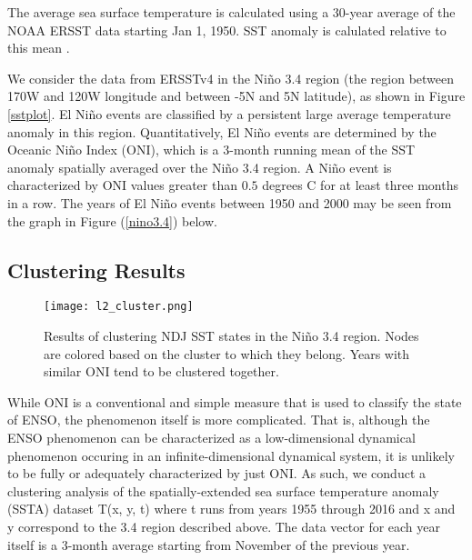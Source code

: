 \documentclass[10pt,journal,compsoc]{IEEEtran} %
\theoremstyle{definition}
\newcommand{\nino}{\text{Ni\~{n}o }}
\begin{document}
The average sea surface temperature is calculated using
a $30$-year average of the NOAA ERSST data starting Jan 1, 1950.  SST
anomaly is calulated relative to this mean
\cite{trenberth1997definition}.

We consider the data from ERSSTv4 in the Ni\~{n}o 3.4 region (the
region between 170W and 120W longitude and between -5N and 5N
latitude), as shown in Figure \ref{sstplot}.  El
Ni\~{n}o events are classified by a persistent large average
temperature anomaly in this region.  Quantitatively, El Ni\~{n}o
events are determined by the Oceanic Ni\~{n}o Index (ONI), which is a
$3$-month running mean of the SST anomaly spatially averaged 
over the Ni\~{n}o 3.4 region.  A Ni\~{n}o event is characterized by ONI
values greater than $0.5$ degrees C for at least three months in a
row.  The years of El Ni\~{n}o events between 1950 and 2000 may be
seen from the graph in Figure (\ref{nino3.4}) below.

\subsection{Clustering Results}
\begin{figure*}[htp]
\texttt{[image: l2\_cluster.png]}
\caption{Results of clustering NDJ SST states in the Ni\~{n}o 3.4
region.  Nodes are colored based on the cluster to which they belong.
Years with similar ONI tend to be clustered together.}\label{cluster}
\end{figure*}

While ONI is a conventional and simple measure that is used to classify the
state of ENSO, the phenomenon itself is more complicated. That is,
although the ENSO phenomenon can be characterized as a low-dimensional
dynamical phenomenon occuring in an infinite-dimensional dynamical
system, it is unlikely to be fully or adequately characterized by just
ONI. As such, we conduct a clustering analysis of the
spatially-extended sea surface temperature anomaly (SSTA) dataset T(x,
y, t) where t runs from years 1955 through 2016 and x and y correspond
to the \nino 3.4 region described above.  The data vector for each
year itself is a 3-month average starting from November of the
previous year.
\end{document}
